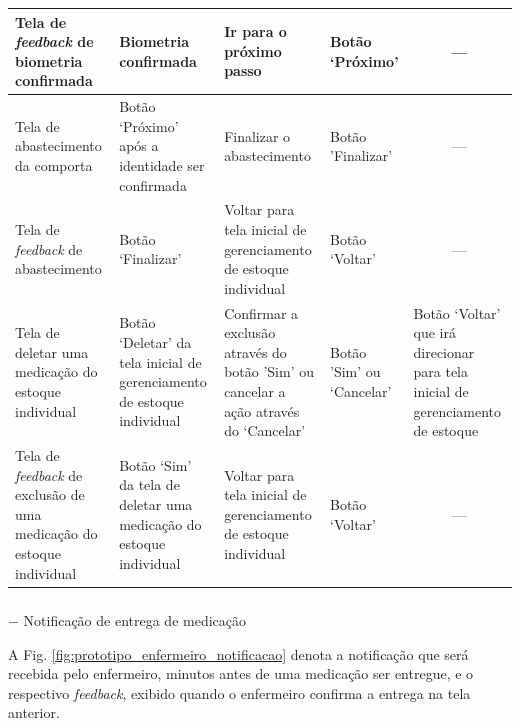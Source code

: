 \begin{table}[H]
\begin{adjustbox}{max width = \textwidth}
\begin{tabular}{|L{5cm}|L{4cm}|L{6cm}|L{4cm}|L{4cm}|}
             Tela de \textit{feedback} de biometria confirmada & Biometria confirmada & Ir para o próximo passo & Botão `Próximo'  &  \\ \hline
             Tela de abastecimento da comporta & Botão `Próximo' após a identidade ser confirmada & Finalizar o abastecimento & Botão 'Finalizar'  &  \\ \hline
             Tela de \textit{feedback} de abastecimento & Botão `Finalizar' & Voltar para tela inicial de gerenciamento de estoque individual & Botão `Voltar' &  \\ \hline
             Tela de deletar uma medicação do estoque individual & Botão `Deletar' da tela inicial de gerenciamento de estoque individual &  Confirmar a exclusão através do botão 'Sim' ou cancelar a ação através do `Cancelar'  & Botão 'Sim' ou `Cancelar' & Botão `Voltar' que irá direcionar para tela inicial de gerenciamento de estoque \\ \hline
             Tela de \textit{feedback} de exclusão de uma medicação do estoque individual & Botão `Sim' da tela de deletar uma medicação do estoque individual & Voltar para tela inicial de gerenciamento de estoque individual  & Botão `Voltar' &  \\ \hline
             
        \end{tabular}
    \end{adjustbox}
\end{table}

\subparagraph*{} $-$ Notificação de entrega de medicação

A Fig. \ref{fig:prototipo_enfermeiro_notificacao} denota a notificação que será recebida pelo enfermeiro, minutos antes de uma medicação ser entregue, e o respectivo \textit{feedback}, exibido quando o enfermeiro confirma a entrega na tela anterior.

